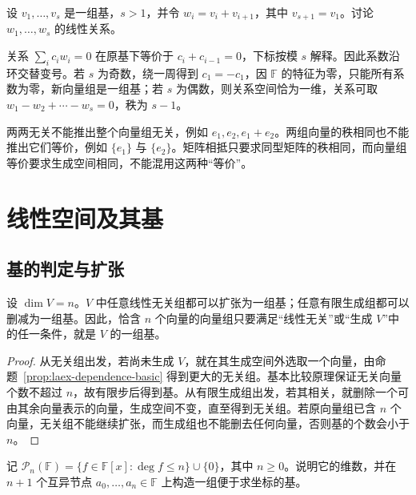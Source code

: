 \begin{example}
\label{ex:laex-cyclic-vectors}
设 $v_1,\ldots,v_s$ 是一组基，$s>1$，并令 $w_i=v_i+v_{i+1}$，其中 $v_{s+1}=v_1$。讨论 $w_1,\ldots,w_s$ 的线性关系。
\end{example}

\begin{solve}
关系 $\sum_i c_iw_i=0$ 在原基下等价于 $c_i+c_{i-1}=0$，下标按模 $s$ 解释。因此系数沿环交替变号。若 $s$ 为奇数，绕一周得到 $c_1=-c_1$，因 $\mathbb F$ 的特征为零，只能所有系数为零，新向量组是一组基；若 $s$ 为偶数，则关系空间恰为一维，关系可取 $w_1-w_2+\cdots-w_s=0$，秩为 $s-1$。
\end{solve}

\begin{notealert}[type=caution,title={区分不同层次的线性关系}]
两两无关不能推出整个向量组无关，例如 $e_1,e_2,e_1+e_2$。两组向量的秩相同也不能推出它们等价，例如 $\{e_1\}$ 与 $\{e_2\}$。矩阵相抵只要求同型矩阵的秩相同，而向量组等价要求生成空间相同，不能混用这两种“等价”。
\end{notealert}

\section{线性空间及其基}
\label{sec:laex-spaces-bases}

\subsection{基的判定与扩张}

\begin{theorem}
\label{thm:laex-basis-extension}
设 $\dim V=n$。$V$ 中任意线性无关组都可以扩张为一组基；任意有限生成组都可以删减为一组基。因此，恰含 $n$ 个向量的向量组只要满足“线性无关”或“生成 $V$”中的任一条件，就是 $V$ 的一组基。
\end{theorem}

\begin{proof}
从无关组出发，若尚未生成 $V$，就在其生成空间外选取一个向量，由命题~\ref{prop:laex-dependence-basic} 得到更大的无关组。基本比较原理保证无关向量个数不超过 $n$，故有限步后得到基。从有限生成组出发，若其相关，就删除一个可由其余向量表示的向量，生成空间不变，直至得到无关组。若原向量组已含 $n$ 个向量，无关组不能继续扩张，而生成组也不能删去任何向量，否则基的个数会小于 $n$。
\end{proof}

\begin{example}
\label{ex:laex-polynomial-bases}
记 $\mathcal P_n(\mathbb F)=\{f\in\mathbb F[x]:\deg f\le n\}\cup\{0\}$，其中 $n\ge0$。说明它的维数，并在 $n+1$ 个互异节点 $a_0,\ldots,a_n\in\mathbb F$ 上构造一组便于求坐标的基。
\end{example}

